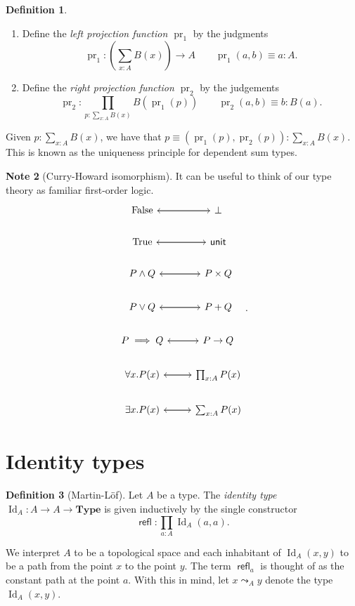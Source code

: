 \documentclass[10pt,letterpaper,cm]{nupset}
\theoremstyle{definition}
\newtheorem{definition}{Definition}[subsection]
\newtheorem{note}[definition]{Note}
\theoremstyle{theorem}
\theoremstyle{remark}
\newcommand{\1}{\mathbf{1}}
\newcommand{\0}{\vec 0}
\DeclareMathOperator{\id}{Id}
\DeclareMathOperator{\refl}{\mathsf{refl}}
\DeclareMathOperator{\pr}{pr}
\begin{document}
\begin{definition} $ $
\begin{enumerate}
\item Define the \textit{left projection function $\pr_1$} by the judgments $$\pr_1 : \left (\sum_{x:A}B(x) \right) \to A  \quad \quad \pr_1(a,b) \equiv a: A.$$
\item Define the \textit{right projection function $\pr_2$} by the judgements  $$ \pr_2 : \prod_{p: \sum_{x:A}B(x)} B(\pr_1(p)) \quad \quad \pr_2(a,b) \equiv b :B(a). $$
\end{enumerate}
\end{definition}


Given $p: \sum_{x:A} B(x)$, we have that $p\equiv \left(\pr_1(p), \pr_2(p)\right) : \sum_{x:A}B(x)$. This is known as the uniqueness principle for dependent sum types.

\bigskip

\begin{note}[Curry-Howard isomorphism]
It can be useful to think of our type theory as familiar first-order logic.
\[
\begin{tikzcd}
\text{False} \arrow[r] & \bot \arrow[l] \\
\text{True} \arrow[r] & \mathsf{unit} \arrow[l] \\
P \land Q \arrow[r] & P\times Q \arrow[l] \\
P\vee Q \arrow[r] & P + Q \arrow[l] \\
P \implies Q \arrow[r] & P \to Q \arrow[l] \\
\forall x.P(x) \arrow[r] & \prod_{x:A}P(x) \arrow[l] \\
\exists x. P(x) \arrow[r] & \sum_{x:A}P(x) \arrow[l]
\end{tikzcd}
.\]
\end{note}

\section{Identity types}

\begin{definition}[Martin-L\"of]
Let $A$ be a type. The \textit{identity type $\id_A : A \to A \to \mathbf{Type}$} is given inductively  by the single constructor $$\refl : \prod_{a: A} \id_A(a,a).$$ 
\end{definition}

We interpret $A$ to be a topological space and each inhabitant of $\id_A(x,y)$ to be a path from the point $x$ to the point $y$. The term $\refl_a$ is thought of as the constant path at the point $a$. With this in mind, let $x \leadsto_A y$ denote the type $\id_A(x,y)$.
\end{document}

